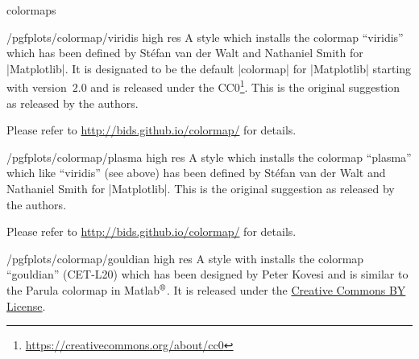 \begin{pgfplotslibrary}{colormaps}
\begin{stylekey}{/pgfplots/colormap/viridis high res}
    A style which installs the colormap ``viridis'' which has been defined by
    Stéfan van der Walt and Nathaniel Smith for |Matplotlib|. It is
    designated to be the default |colormap| for |Matplotlib| starting with
    version~$2.0$ and is released under the
    CC0\footnote{\url{https://creativecommons.org/about/cc0}}. This is the
    original suggestion as released by the authors.

    Please refer to \url{http://bids.github.io/colormap/} for details.
\begin{codeexample}
\pgfplotsset{
    colormap name=viridis,
}
\end{codeexample}

\begin{codeexample}
\pgfplotsset{
    colormap/viridis high res,
}
\end{codeexample}
\end{stylekey}

\begin{stylekey}{/pgfplots/colormap/plasma high res}
    A style which installs the colormap ``plasma'' which like
    ``viridis'' (see above) has been defined by Stéfan van der Walt and
    Nathaniel Smith for |Matplotlib|. This is the original suggestion as
    released by the authors.

    Please refer to \url{http://bids.github.io/colormap/} for details.
\begin{codeexample}
\pgfplotsset{
    colormap name=plasma,
}
\end{codeexample}

\begin{codeexample}
\pgfplotsset{
    colormap/plasma high res,
}
\end{codeexample}
\end{stylekey}

\begin{stylekey}{/pgfplots/colormap/gouldian high res}
    A style with installs the colormap ``gouldian'' (CET-L20) which has been
    designed by Peter Kovesi and is similar to the Parula colormap in
    Matlab$^\text{\textregistered}$. It is released under the
    \href{http://creativecommons.org/licenses/by/4.0/legalcode}{Creative Commons
    BY License}.


\end{stylekey}
\end{pgfplotslibrary}
